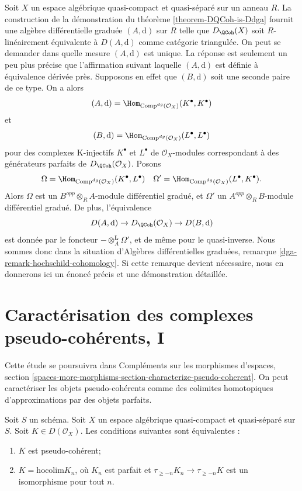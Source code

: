 \begin{remark}
\label{remark-independence-choice}
Soit $X$ un espace alg\'ebrique quasi-compact et quasi-s\'epar\'e sur un anneau
$R$. La construction de la d\'emonstration du th\'eor\`eme
\ref{theorem-DQCoh-is-Ddga} fournit une alg\`ebre diff\'erentielle gradu\'ee
$(A,\text{d})$ sur $R$ telle que $D_\QCoh(X)$ soit $R$-lin\'eairement
\'equivalente \`a $D(A,\text{d})$ comme cat\'egorie triangul\'ee. On peut se
demander dans quelle mesure $(A,\text{d})$ est unique. La r\'eponse est
seulement un peu plus pr\'ecise que l'affirmation suivant laquelle
$(A,\text{d})$ est d\'efinie \`a \'equivalence d\'eriv\'ee pr\`es. Supposons en
effet que $(B,\text{d})$ soit une seconde paire de ce type. On a alors
$$
(A, \text{d}) = \Hom_{\text{Comp}^{dg}(\mathcal{O}_X)}(K^\bullet, K^\bullet)
$$
et
$$
(B, \text{d}) = \Hom_{\text{Comp}^{dg}(\mathcal{O}_X)}(L^\bullet, L^\bullet)
$$
pour des complexes K-injectifs $K^\bullet$ et $L^\bullet$ de
$\mathcal{O}_X$-modules correspondant \`a des g\'en\'erateurs parfaits de
$D_\QCoh(\mathcal{O}_X)$. Posons
$$
\Omega = \Hom_{\text{Comp}^{dg}(\mathcal{O}_X)}(K^\bullet, L^\bullet)
\quad
\Omega' = \Hom_{\text{Comp}^{dg}(\mathcal{O}_X)}(L^\bullet, K^\bullet).
$$
Alors $\Omega$ est un $B^{opp}\otimes_RA$-module diff\'erentiel gradu\'e, et
$\Omega'$ un $A^{opp}\otimes_RB$-module diff\'erentiel gradu\'e. De plus,
l'\'equivalence
$$
D(A, \text{d}) \to D_\QCoh(\mathcal{O}_X) \to
D(B, \text{d})
$$
est donn\'ee par le foncteur $-\otimes_A^\mathbf{L}\Omega'$, et de m\^eme pour
le quasi-inverse. Nous sommes donc dans la situation d'Alg\`ebres
diff\'erentielles gradu\'ees, remarque
\ref{dga-remark-hochschild-cohomology}. Si cette remarque devient n\'ecessaire,
nous en donnerons ici un \'enonc\'e pr\'ecis et une d\'emonstration d\'etaill\'ee.
\end{remark}

\section{Caract\'erisation des complexes pseudo-coh\'erents, I}
\label{section-pseudo-coherent-hocolim}

\noindent
Cette \'etude se poursuivra dans Compl\'ements sur les morphismes d'espaces,
section
\ref{spaces-more-morphisms-section-characterize-pseudo-coherent}.
On peut caract\'eriser les objets pseudo-coh\'erents
comme des colimites homotopiques d'approximations par des objets parfaits.

\begin{lemma}
\label{lemma-pseudo-coherent-hocolim}
Soit $S$ un sch\'ema.
Soit $X$ un espace alg\'ebrique quasi-compact et quasi-s\'epar\'e sur $S$.
Soit $K \in D(\mathcal{O}_X)$. Les conditions suivantes sont \'equivalentes :
\begin{enumerate}
\item $K$ est pseudo-coh\'erent;
\item $K = \text{hocolim} K_n$, o\`u
$K_n$ est parfait et $\tau_{\geq -n}K_n \to \tau_{\geq -n}K$
est un isomorphisme pour tout $n$.
\end{enumerate}
\end{lemma}

